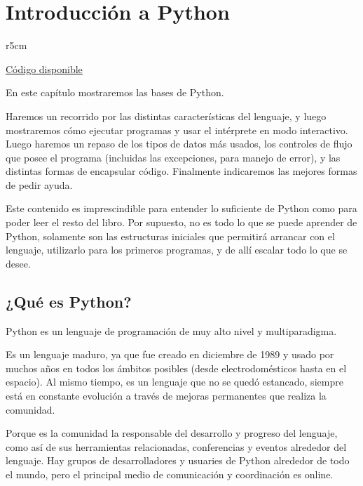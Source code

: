 \chapter{Introducción a Python} \label{ch:intro}

\begin{wraptable}{r}{5cm}
\begin{modulesinfo}
\begin{center}
{\small
    \href{https://github.com/facundobatista/libro-pyciencia/tree/master/código/intro/}{Código disponible}
}
\end{center}
\end{modulesinfo}
\end{wraptable}

En este capítulo mostraremos las bases de Python. 

Haremos un recorrido por las distintas características del lenguaje, y luego mostraremos cómo ejecutar programas y usar el intérprete en modo interactivo. Luego haremos un repaso de los tipos de datos más usados, los controles de flujo que posee el programa (incluidas las excepciones, para manejo de error), y las distintas formas de encapsular código. Finalmente indicaremos las mejores formas de pedir ayuda.

Este contenido es imprescindible para entender lo suficiente de Python como para poder leer el resto del libro. Por supuesto, no es todo lo que se puede aprender de Python, solamente son las estructuras iniciales que permitirá arrancar con el lenguaje, utilizarlo para los primeros programas, y de allí escalar todo lo que se desee.


\section{¿Qué es Python?}\label{sec:que-es-python}

Python es un lenguaje de programación de muy alto nivel y multiparadigma.

Es un lenguaje maduro, ya que fue creado en diciembre de 1989 y usado por muchos años en todos los ámbitos posibles (desde electrodomésticos hasta en el espacio). Al mismo tiempo, es un lenguaje que no se quedó estancado, siempre está en constante evolución a través de mejoras permanentes que realiza la comunidad.

Porque es la comunidad la responsable del desarrollo y progreso del lenguaje, como así de sus herramientas relacionadas, conferencias y eventos alrededor del lenguaje. Hay grupos de desarrolladores y usuaries de Python alrededor de todo el mundo, pero el principal medio de comunicación y coordinación es online.

